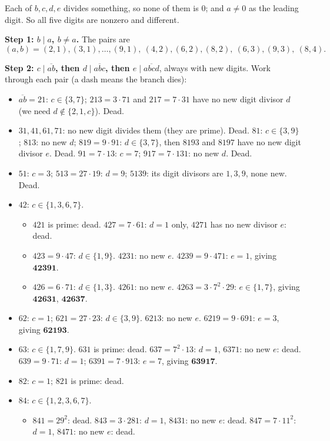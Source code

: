 Each of $b,c,d,e$ divides something, so none of them is $0$; and $a\ne0$ as the leading digit. So all five digits are nonzero and different.

\textbf{Step 1: $b\mid a$, $b\ne a$.} The pairs are
\[
(a,b)=(2,1),(3,1),\dots,(9,1),\ (4,2),(6,2),(8,2),\ (6,3),(9,3),\ (8,4).
\]

\textbf{Step 2: $c\mid\overline{ab}$, then $d\mid\overline{abc}$, then $e\mid\overline{abcd}$}, always with new digits. Work through each pair (a dash means the branch dies):
\begin{itemize}
\item $\overline{ab}=21$: $c\in\{3,7\}$; $213=3\cdot71$ and $217=7\cdot31$ have no new digit divisor $d$ (we need $d\notin\{2,1,c\}$). Dead.
\item $31,41,61,71$: no new digit divides them (they are prime). Dead. $81$: $c\in\{3,9\}$; $813$: no new $d$; $819=9\cdot91$: $d\in\{3,7\}$, then $8193$ and $8197$ have no new digit divisor $e$. Dead. $91=7\cdot13$: $c=7$; $917=7\cdot131$: no new $d$. Dead.
\item $51$: $c=3$; $513=27\cdot19$: $d=9$; $5139$: its digit divisors are $1,3,9$, none new. Dead.
\item $42$: $c\in\{1,3,6,7\}$.
  \begin{itemize}
  \item $421$ is prime: dead. $427=7\cdot61$: $d=1$ only, $4271$ has no new divisor $e$: dead.
  \item $423=9\cdot47$: $d\in\{1,9\}$. $4231$: no new $e$. $4239=9\cdot471$: $e=1$, giving $\mathbf{42391}$.
  \item $426=6\cdot71$: $d\in\{1,3\}$. $4261$: no new $e$. $4263=3\cdot7^2\cdot29$: $e\in\{1,7\}$, giving $\mathbf{42631}$, $\mathbf{42637}$.
  \end{itemize}
\item $62$: $c=1$; $621=27\cdot23$: $d\in\{3,9\}$. $6213$: no new $e$. $6219=9\cdot691$: $e=3$, giving $\mathbf{62193}$.
\item $63$: $c\in\{1,7,9\}$. $631$ is prime: dead. $637=7^2\cdot13$: $d=1$, $6371$: no new $e$: dead. $639=9\cdot71$: $d=1$; $6391=7\cdot913$: $e=7$, giving $\mathbf{63917}$.
\item $82$: $c=1$; $821$ is prime: dead.
\item $84$: $c\in\{1,2,3,6,7\}$.
  \begin{itemize}
  \item $841=29^2$: dead. $843=3\cdot281$: $d=1$, $8431$: no new $e$: dead. $847=7\cdot11^2$: $d=1$, $8471$: no new $e$: dead.

\end{itemize}
\end{itemize}
